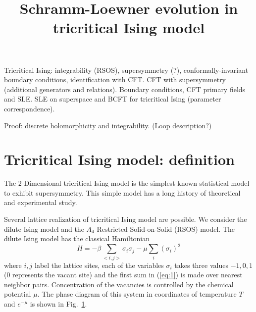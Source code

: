 \documentclass[12pt]{article}
\begin{document}
\title{Schramm-Loewner evolution in tricritical Ising model}

\maketitle

Tricritical Ising: integrability (RSOS), supersymmetry (?), conformally-invariant boundary conditions, identification with CFT. 
CFT with supersymmetry (additional generators and relations). 
Boundary conditions, CFT primary fields and SLE. 
SLE on superspace \cite{nagi2005stochastic,rasmussen2004stochastic} and BCFT for tricritical Ising (parameter correspondence).

Proof: discrete holomorphicity and integrability. 
(Loop description?)

\section{Tricritical Ising model: definition}
\label{sec:tricr-ising-model}

The 2-Dimensional tricritical Ising model is the simplest known statistical model to exhibit
supersymmetry. This simple model has a long history of theoretical and experimental study.

Several lattice realization of tricritical Ising model are possible. We consider the dilute Ising model and the $A_4$
Restricted Solid-on-Solid (RSOS) model. The dilute Ising model has the classical Hamiltonian 
\begin{equation}
  \label{eq:1}
  H = -\beta \sum_{<i,j>}\sigma_i\sigma_j - \mu \sum_{i}(\sigma_i)^2  
\end{equation}
where $i,j$ label the lattice sites, each of the variables $\sigma_i$
takes three values $-1,0,1$ ($0$ represents the vacant site) and the
first sum in (\ref{eq:1}) is made over nearest neighbor pairs. Concentration
of the vacancies is controlled by the chemical potential $\mu$. The
phase diagram of this system in coordinates of temperature $T$ and
$e^{-\mu}$ is shown in Fig.~\ref{fig:phase-diagram}.

\begin{figure}[h]
  \label{fig:phase-diagram}
\end{figure}
\end{document}
